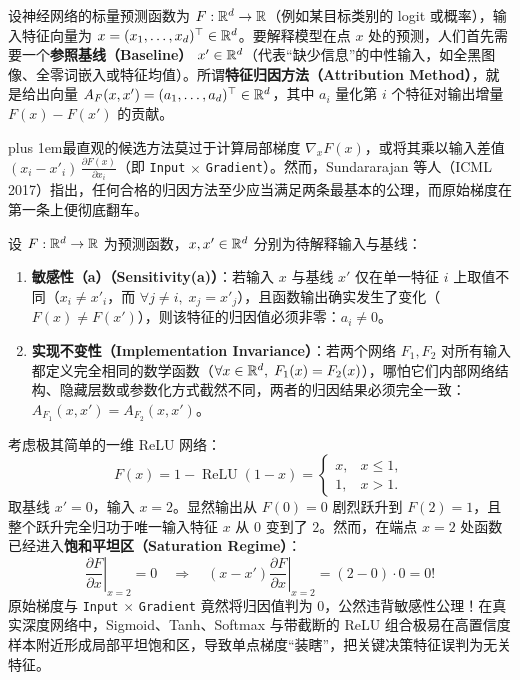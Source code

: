 设神经网络的标量预测函数为 $F: \mathbb{R}^d \to \mathbb{R}$（例如某目标类别的 logit 或概率），输入特征向量为 $x = (x_1, \dots, x_d)^\top \in \mathbb{R}^d$。要解释模型在点 $x$ 处的预测，人们首先需要一个\textbf{参照基线（Baseline）} $x' \in \mathbb{R}^d$（代表“缺少信息”的中性输入，如全黑图像、全零词嵌入或特征均值）。所谓\textbf{特征归因方法（Attribution Method）}，就是给出向量 $A_F(x, x') = (a_1, \dots, a_d)^\top \in \mathbb{R}^d$，其中 $a_i$ 量化第 $i$ 个特征对输出增量 $F(x) - F(x')$ 的贡献。

{\rightskip=0pt plus 1em\relax 最直观的候选方法莫过于计算局部梯度 $\nabla_x F(x)$，或将其乘以输入差值 $(x_i - x'_i)\,\frac{\partial F(x)}{\partial x_i}$（即 \texttt{Input} $\times$ \texttt{Gradient}）。然而，Sundararajan 等人（ICML 2017）指出，任何合格的归因方法至少应当满足两条最基本的公理，而原始梯度在第一条上便彻底翻车。\par}

\begin{defBox}
\begin{definition}[归因的敏感性公理与实现不变性公理]\label{def:ig-axioms}
设 $F: \mathbb{R}^d \to \mathbb{R}$ 为预测函数，$x, x' \in \mathbb{R}^d$ 分别为待解释输入与基线：
\begin{enumerate}
  \item \textbf{敏感性（a）（Sensitivity(a)）}：若输入 $x$ 与基线 $x'$ 仅在单一特征 $i$ 上取值不同（$x_i \neq x'_i$，而 $\forall j \neq i,\; x_j = x'_j$），且函数输出确实发生了变化（$F(x) \neq F(x')$），则该特征的归因值必须非零：$a_i \neq 0$。
  \item \textbf{实现不变性（Implementation Invariance）}：若两个网络 $F_1, F_2$ 对所有输入都定义完全相同的数学函数（$\forall x \in \mathbb{R}^d,\; F_1(x) = F_2(x)$），哪怕它们内部网络结构、隐藏层数或参数化方式截然不同，两者的归因结果必须完全一致：$A_{F_1}(x, x') = A_{F_2}(x, x')$。
\end{enumerate}
\end{definition}
\end{defBox}

\begin{example}\label{ex:grad-fail}
考虑极其简单的一维 ReLU 网络：
\[
  F(x) = 1 - \operatorname{ReLU}(1 - x) =
  \begin{cases}
    x, & x \le 1, \\
    1, & x > 1.
  \end{cases}
\]
取基线 $x' = 0$，输入 $x = 2$。显然输出从 $F(0) = 0$ 剧烈跃升到 $F(2) = 1$，且整个跃升完全归功于唯一输入特征 $x$ 从 $0$ 变到了 $2$。然而，在端点 $x = 2$ 处函数已经进入\textbf{饱和平坦区（Saturation Regime）}：
\[
  \left.\frac{\partial F}{\partial x}\right|_{x=2} = 0
  \quad\Longrightarrow\quad
  (x - x')\left.\frac{\partial F}{\partial x}\right|_{x=2} = (2 - 0)\cdot 0 = 0!
\]
原始梯度与 \texttt{Input} $\times$ \texttt{Gradient} 竟然将归因值判为 $0$，公然违背敏感性公理！在真实深度网络中，Sigmoid、Tanh、Softmax 与带截断的 ReLU 组合极易在高置信度样本附近形成局部平坦饱和区，导致单点梯度“装瞎”，把关键决策特征误判为无关特征。
\end{example}

